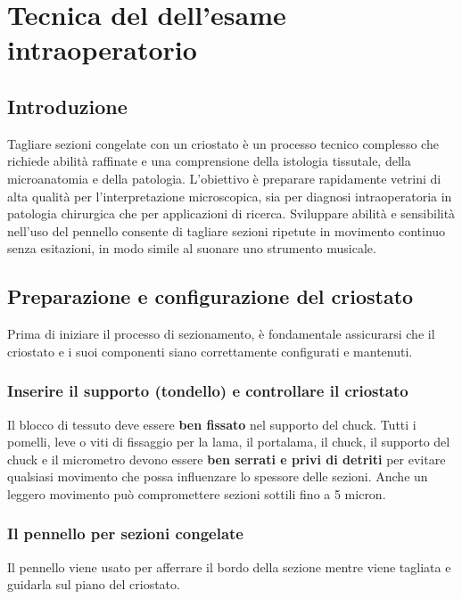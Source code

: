 \chapter{Tecnica del dell'esame intraoperatorio}

\section{Introduzione}
Tagliare sezioni congelate con un criostato è un processo tecnico complesso che richiede abilità raffinate e una comprensione della istologia tissutale, della microanatomia e della patologia. L'obiettivo è preparare rapidamente vetrini di alta qualità per l'interpretazione microscopica, sia per diagnosi intraoperatoria in patologia chirurgica che per applicazioni di ricerca. Sviluppare abilità e sensibilità nell'uso del pennello consente di tagliare sezioni ripetute in movimento continuo senza esitazioni, in modo simile al suonare uno strumento musicale.

\section{Preparazione e configurazione del criostato}
Prima di iniziare il processo di sezionamento, è fondamentale assicurarsi che il criostato e i suoi componenti siano correttamente configurati e mantenuti.

\subsection{Inserire il supporto (tondello) e controllare il criostato}
Il blocco di tessuto deve essere \textbf{ben fissato} nel supporto del chuck. Tutti i pomelli, leve o viti di fissaggio per la lama, il portalama, il chuck, il supporto del chuck e il micrometro devono essere \textbf{ben serrati e privi di detriti} per evitare qualsiasi movimento che possa influenzare lo spessore delle sezioni. Anche un leggero movimento può compromettere sezioni sottili fino a 5 micron.

\subsection{Il pennello per sezioni congelate} 
Il pennello viene usato per afferrare il bordo della sezione mentre viene tagliata e guidarla sul piano del criostato.

